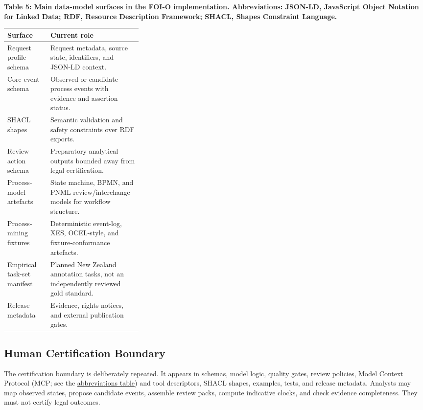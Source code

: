 \documentclass[
]{article}
\begin{document}
\begin{table}[H]
\small
\hypertarget{tab-data-model-surfaces}{}
\begin{center}\small\textbf{Table 5: Main data-model surfaces in the FOI-O implementation. Abbreviations: JSON-LD, JavaScript Object Notation for Linked Data; RDF, Resource Description Framework; SHACL, Shapes Constraint Language.}\end{center}
\begin{tabularx}{\linewidth}{>{\raggedright\arraybackslash}p{0.32\linewidth}X}
\toprule
Surface & Current role \\
\midrule
Request profile schema & Request metadata, source state, identifiers, and JSON-LD context. \\
Core event schema & Observed or candidate process events with evidence and assertion status. \\
SHACL shapes & Semantic validation and safety constraints over RDF exports. \\
Review action schema & Preparatory analytical outputs bounded away from legal certification. \\
Process-model artefacts & State machine, BPMN, and PNML review/interchange models for workflow structure. \\
Process-mining fixtures & Deterministic event-log, XES, OCEL-style, and fixture-conformance artefacts. \\
Empirical task-set manifest & Planned New Zealand annotation tasks, not an independently reviewed gold standard. \\
Release metadata & Evidence, rights notices, and external publication gates. \\
\bottomrule
\end{tabularx}
\end{table}

\subsection{Human Certification
Boundary}\label{human-certification-boundary}

The certification boundary is deliberately repeated. It appears in
schemas, model logic, quality gates, review policies, Model Context
Protocol (MCP; see the
\hyperlink{tab-abbreviations}{abbreviations table}) and tool
descriptors, SHACL shapes, examples, tests, and release metadata.
Analysts may map observed states, propose candidate events, assemble
review packs, compute indicative clocks, and check evidence
completeness. They must not certify legal outcomes.
\end{document}
